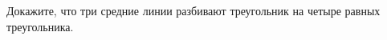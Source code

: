 \begin{ex}
	\begin{condition}
		Докажите, что три средние линии разбивают треугольник на четыре равных треугольника.
	\end{condition}
\end{ex}